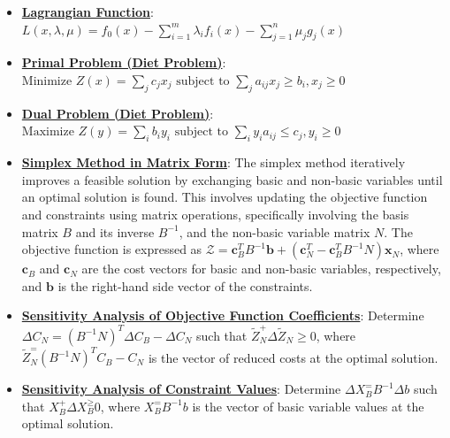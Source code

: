 \documentclass{article}%
\begin{document}
\begin{itemize}[leftmargin=*]%
\item \href{https://www.math.purdue.edu/~yipn/421/2024-09-17-DualityGeneral.pdf#page=7}{\textbf{Lagrangian Function}}: $L(x,\lambda,\mu) = f_0(x) - \sum_{i=1}^m \lambda_i f_i(x) - \sum_{j=1}^n \mu_j g_j(x)$%
\end{itemize}%
\begin{itemize}[leftmargin=*]%
\item \href{https://www.math.purdue.edu/~yipn/421/2024-09-19-DualityExamples.pdf#page=5}{\textbf{Primal Problem (Diet Problem)}}: $\text{Minimize } Z(x) = \sum_{j} c_j x_j \text{ subject to } \sum_{j} a_{ij} x_j \ge b_i, x_j \ge 0$%
\item \href{https://www.math.purdue.edu/~yipn/421/2024-09-19-DualityExamples.pdf#page=8}{\textbf{Dual Problem (Diet Problem)}}: $\text{Maximize } Z(y) = \sum_{i} b_i y_i \text{ subject to } \sum_{i} y_i a_{ij} \le c_j, y_i \ge 0$%
\end{itemize}%
\begin{itemize}[leftmargin=*]%
\item \href{https://www.math.purdue.edu/~yipn/421/2024-09-24-SimplexMatrix.pdf#page=8}{\textbf{Simplex Method in Matrix Form}}: The simplex method iteratively improves a feasible solution by exchanging basic and non-basic variables until an optimal solution is found. This involves updating the objective function and constraints using matrix operations, specifically involving the basis matrix $B$ and its inverse $B^{-1}$, and the non-basic variable matrix $N$. The objective function is expressed as $\mathcal{Z} = \mathbf{c}_B^T B^{-1} \mathbf{b} + (\mathbf{c}_N^T - \mathbf{c}_B^T B^{-1} N) \mathbf{x}_N$, where $\mathbf{c}_B$ and $\mathbf{c}_N$ are the cost vectors for basic and non-basic variables, respectively, and $\mathbf{b}$ is the right-hand side vector of the constraints.%
\end{itemize}%
\begin{itemize}[leftmargin=*]%
\item \href{https://www.math.purdue.edu/~yipn/421/2024-09-26-Sensitivity.pdf#page=7}{\textbf{Sensitivity Analysis of Objective Function Coefficients}}: Determine $\Delta C_N = (B^{-1}N)^T\Delta C_B - \Delta C_N$ such that $\tilde{Z}_N^ + \Delta \tilde{Z}_N \ge 0$, where $\tilde{Z}_N^ = (B^{-1}N)^TC_B - C_N$ is the vector of reduced costs at the optimal solution.%
\item \href{https://www.math.purdue.edu/~yipn/421/2024-09-26-Sensitivity.pdf#page=11}{\textbf{Sensitivity Analysis of Constraint Values}}: Determine $\Delta X_B^ = B^{-1}\Delta b$ such that $X_B^ + \Delta X_B^ \ge 0$, where $X_B^ = B^{-1}b$ is the vector of basic variable values at the optimal solution.%
\end{itemize}%
\end{document}
